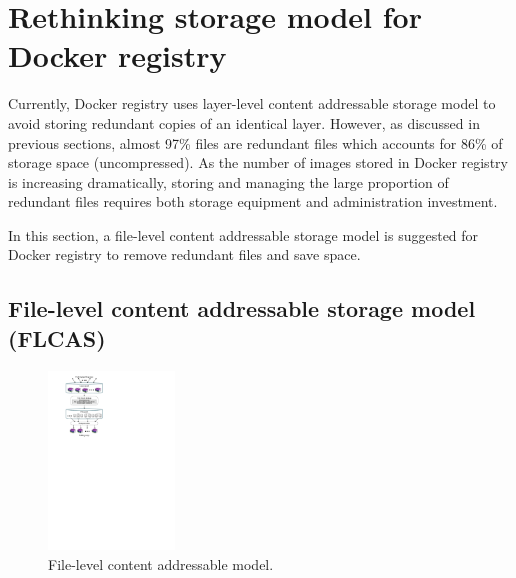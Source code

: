 \section{Rethinking storage model for Docker registry}
\label{sec:file_adressable}

Currently, Docker registry uses layer-level content addressable storage model to avoid storing redundant copies of an identical layer. 
However, as discussed in previous sections, almost 97\% files are redundant files which accounts for 86\% of storage space (uncompressed). 
As the number of images stored in Docker registry is increasing dramatically, 
storing and managing the large proportion of redundant files requires both storage equipment and administration investment. 

In this section, a file-level content addressable storage model is suggested for Docker registry to remove redundant files and save space.   

\subsection{File-level content addressable storage model (FLCAS)}
\label{subsec:FLCAS}

\begin{figure}
	\centering
	\includegraphics[width=0.3\textwidth]{graphs/graph_compression_layers.pdf}
	\caption{File-level content addressable model.
	}
	\label{fig:file-dedup-model}
\end{figure}

